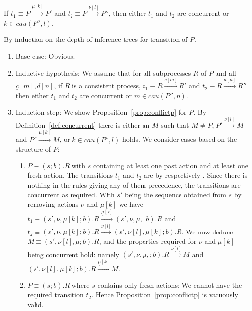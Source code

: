 \begin{subappendices}
\setcounter{proposition}{5}
\setcounter{thm}{0}

\begin{proposition}\label{prop:conflictp} \normalfont If $t_1 \equiv P \xrightarrow{\underline{\mu}[k]} P'$ and $t_2 \equiv P \xrightarrow{\nu[l]} P''$, then either $t_1$ and $t_2$ are concurrent or $k \in cau(P'',l)$.
\end{proposition}

\begin{pf}
By induction on the depth of inference trees for transition of $P$.
\begin{enumerate}
\item Base case: Obvious.
\item Inductive hypothesis: We assume that for all subprocesses $R$ of $P$ and all 
$\underline{c}[m], d[n]$, if $R$ is a consistent process, $t_1 \equiv R \xrightarrow{\underline{c}[m]} R'$ and $t_2 \equiv R \xrightarrow{d[n]} R''$ then either $t_1$ and $t_2$ are concurrent or $m \in cau(P'',n)$.
\item Induction step: We show Proposition~\ref{prop:conflictp} for $P$. By Definition~\ref{def:concurrent} there is either an $M$ such that $M \neq P$, $P' \xrightarrow{\nu[l]} M$ and 
$P'' \xrightarrow{\underline{\mu}[k]} M$, or $k \in cau(P'',l)$ holds. We consider cases based
on the structure of $P$:
\begin{enumerate}
\item $P\equiv (s;b).R$ with $s$ containing at least one past action and at least one fresh action.
The transitions $t_1$ and $t_2$ are by  respectively . 
Since there is nothing in the rules giving any of them precedence, the transitions are concurrent as required. With $s'$ being the sequence obtained from $s$ by removing actions $\nu$ and $\mu[k]$ we have $t_1 \equiv (s',\nu,\mu[k];b).R \xrightarrow{\underline{\mu}[k]} (s',\nu,\mu,;b).R$ and $t_2 \equiv (s',\nu,\mu[k];b).R \xrightarrow{\nu[l]} (s',\nu[l],\mu[k];b).R$. 
We now deduce $M \equiv (s',\nu[l],\mu;b).R$, and the properties required for $\nu$ and $\mu[k]$ 
being concurrent hold: namely $(s',\nu,\mu,;b).R \xrightarrow{\nu[l]} M$ and $(s',\nu[l],\mu[k];b).R \xrightarrow{\underline{\mu}[k]} M$.
\item $P\equiv (s;b).R$ where $s$ contains only fresh actions: We cannot have the
required transition $t_2$. Hence Proposition~\ref{prop:conflictp} is vacuously valid.


\end{enumerate}
\end{enumerate}
\end{pf}
\end{subappendices}
